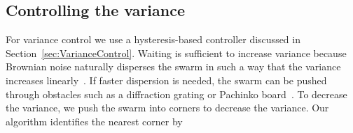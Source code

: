 

\subsection{Controlling the variance}


For variance control we use a hysteresis-based controller discussed in Section~\ref{sec:VarianceControl}.  Waiting is sufficient to increase variance because Brownian noise naturally disperses the swarm in such a way that the variance increases linearly~\cite{einstein1956investigations}.  If faster dispersion is needed, the swarm can be pushed through obstacles such as a diffraction grating or Pachinko board~\cite{Becker2013b}. To decrease the variance, we push the swarm into corners to decrease the variance.  Our algorithm identifies the nearest corner by 

